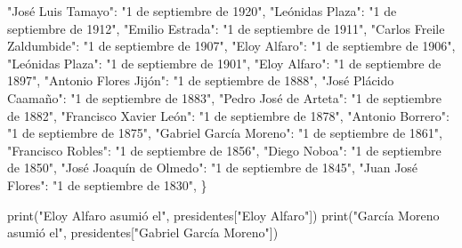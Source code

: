 \documentclass[
  a4paper,
  DIV=11,
  numbers=noendperiod,
  onepage,
  openany]{scrreprt}
\newenvironment{Shaded}{\begin{snugshade}}{\end{snugshade}}
\newcommand{\BuiltInTok}[1]{\textcolor[rgb]{0.00,0.23,0.31}{#1}}
\newcommand{\NormalTok}[1]{\textcolor[rgb]{0.00,0.23,0.31}{#1}}
\newcommand{\StringTok}[1]{\textcolor[rgb]{0.13,0.47,0.30}{#1}}
\begin{document}
\begin{tcolorbox}
\begin{Shaded}
\begin{Highlighting}[]
    \StringTok{"José Luis Tamayo"}\NormalTok{: }\StringTok{"1 de septiembre de 1920"}\NormalTok{,}
    \StringTok{"Leónidas Plaza"}\NormalTok{: }\StringTok{"1 de septiembre de 1912"}\NormalTok{,}
    \StringTok{"Emilio Estrada"}\NormalTok{: }\StringTok{"1 de septiembre de 1911"}\NormalTok{,}
    \StringTok{"Carlos Freile Zaldumbide"}\NormalTok{: }\StringTok{"1 de septiembre de 1907"}\NormalTok{,}
    \StringTok{"Eloy Alfaro"}\NormalTok{: }\StringTok{"1 de septiembre de 1906"}\NormalTok{,}
    \StringTok{"Leónidas Plaza"}\NormalTok{: }\StringTok{"1 de septiembre de 1901"}\NormalTok{,}
    \StringTok{"Eloy Alfaro"}\NormalTok{: }\StringTok{"1 de septiembre de 1897"}\NormalTok{,}
    \StringTok{"Antonio Flores Jijón"}\NormalTok{: }\StringTok{"1 de septiembre de 1888"}\NormalTok{,}
    \StringTok{"José Plácido Caamaño"}\NormalTok{: }\StringTok{"1 de septiembre de 1883"}\NormalTok{,}
    \StringTok{"Pedro José de Arteta"}\NormalTok{: }\StringTok{"1 de septiembre de 1882"}\NormalTok{,}
    \StringTok{"Francisco Xavier León"}\NormalTok{: }\StringTok{"1 de septiembre de 1878"}\NormalTok{,}
    \StringTok{"Antonio Borrero"}\NormalTok{: }\StringTok{"1 de septiembre de 1875"}\NormalTok{,}
    \StringTok{"Gabriel García Moreno"}\NormalTok{: }\StringTok{"1 de septiembre de 1861"}\NormalTok{,}
    \StringTok{"Francisco Robles"}\NormalTok{: }\StringTok{"1 de septiembre de 1856"}\NormalTok{,}
    \StringTok{"Diego Noboa"}\NormalTok{: }\StringTok{"1 de septiembre de 1850"}\NormalTok{,}
    \StringTok{"José Joaquín de Olmedo"}\NormalTok{: }\StringTok{"1 de septiembre de 1845"}\NormalTok{,}
    \StringTok{"Juan José Flores"}\NormalTok{: }\StringTok{"1 de septiembre de 1830"}\NormalTok{,}
\NormalTok{\}}

\BuiltInTok{print}\NormalTok{(}\StringTok{"Eloy Alfaro asumió el"}\NormalTok{, presidentes[}\StringTok{"Eloy Alfaro"}\NormalTok{])}
\BuiltInTok{print}\NormalTok{(}\StringTok{"García Moreno asumió el"}\NormalTok{, presidentes[}\StringTok{"Gabriel García Moreno"}\NormalTok{])}
\end{Highlighting}
\end{Shaded}

\end{tcolorbox}
\end{document}
